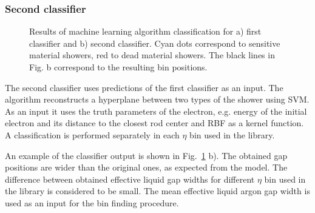 \begin{figure}[!tbp]
\end{figure}

\subsubsection{Second classifier}

\begin{figure}[!tbp]
\begin{minipage}[h]{0.49\linewidth}
\end{minipage}
\hfill
\begin{minipage}[h]{0.49\linewidth}
\end{minipage}
\caption{Results of machine learning algorithm classification for a) first classifier and b) second classifier. Cyan dots correspond to sensitive material showers, red to dead material showers. The black lines in Fig. b correspond to the resulting bin positions.}
\label{fig:Class}
\end{figure}

The second classifier uses predictions of the first classifier as an input. The algorithm reconstructs a hyperplane between two types of the shower using SVM.  As an input it uses the truth parameters of the electron, e.g. energy of the initial electron and its distance to the closest rod center and RBF as a kernel function.  A classification is performed separately in each $\eta$ bin used in the library. 

An example of the classifier output is shown in Fig.~\ref{fig:Class} b). The obtained gap positions are wider than the original ones, as  expected from the model.  The difference between obtained effective liquid gap widths for different $\eta$ bin used in the library is considered to be small. The mean effective liquid argon gap width is used as an input for the bin finding procedure.  

